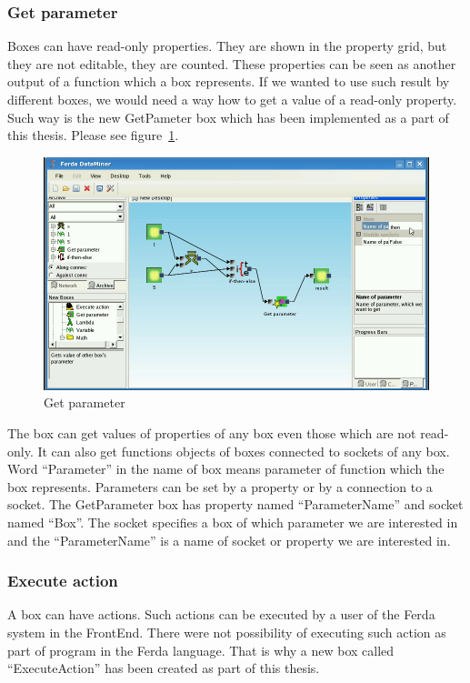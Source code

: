 \documentclass[a4paper,12pt]{book}
\begin{document}
\subsubsection{Get parameter}
Boxes can have read-only properties. They are shown in the property grid, but they are not editable, they are counted. These properties can be seen as another output of a function which a box represents. If we wanted to use such result by different boxes, we would need a way how to get a value of a read-only property. Such way is the new GetPameter box which has been implemented as a part of this thesis. Please see figure~\ref{fig:boxGetParameter}.

\begin{figure}
	\includegraphics[width=1\textwidth]{getParameter2.png}
	\caption{Get parameter}
	\label{fig:boxGetParameter}
\end{figure}

The box can get values of properties of any box even those which are not read-only. It can also get functions objects of boxes connected to sockets of any box. Word ``Parameter'' in the name of box means parameter of function which the box represents. Parameters can be set by a property or by a connection to a socket. The GetParameter box has property named ``ParameterName'' and socket named ``Box''. The socket specifies a box of which parameter we are interested in and the ``ParameterName'' is a name of socket or property we are interested in.

\subsubsection{Execute action}
A box can have actions. Such actions can be executed by a user of the Ferda system in the FrontEnd. There were not possibility of executing such action as part of program in the Ferda language. That is why a new box called ``ExecuteAction'' has been created as part of this thesis.
\end{document}
